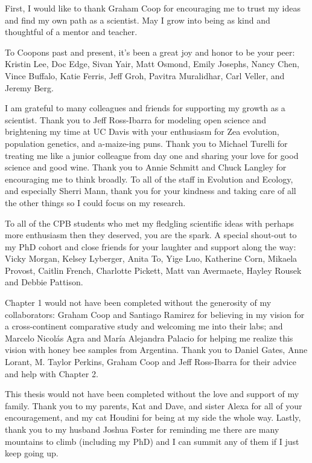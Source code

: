 First, I would like to thank Graham Coop for encouraging me to trust my ideas and find my own path as a scientist. May I grow into being as kind and thoughtful of a mentor and teacher. 

To Coopons past and present, it’s been a great joy and honor to be your peer: Kristin Lee, Doc Edge, Sivan Yair, Matt Osmond, Emily Josephs, Nancy Chen, Vince Buffalo, Katie Ferris, Jeff Groh, Pavitra Muralidhar, Carl Veller, and Jeremy Berg.

I am grateful to many colleagues and friends for supporting my growth as a scientist. Thank you to Jeff Ross-Ibarra for modeling open science and brightening my time at UC Davis with your enthusiasm for Zea evolution, population genetics, and a-maize-ing puns. Thank you to Michael Turelli for treating me like a junior colleague from day one and sharing your love for good science and good wine. Thank you to Annie Schmitt and Chuck Langley for encouraging me to think broadly. To all of the staff in Evolution and Ecology, and especially Sherri Mann, thank you for your kindness and taking care of all the other things so I could focus on my research. 

To all of the CPB students who met my fledgling scientific ideas with perhaps more enthusiasm then they deserved, you are the spark. A special shout-out to my PhD cohort and close friends for your laughter and support along the way: Vicky Morgan, Kelsey Lyberger, Anita To, Yige Luo, Katherine Corn, Mikaela Provost, Caitlin French, Charlotte Pickett, Matt van Avermaete, Hayley Rousek and Debbie Pattison.

Chapter 1 would not have been completed without the generosity of my collaborators: Graham Coop and Santiago Ramirez for believing in my vision for a cross-continent comparative study and welcoming me into their labs; and Marcelo Nicolás Agra and María Alejandra Palacio for helping me realize this vision with honey bee samples from Argentina. Thank you to Daniel Gates, Anne Lorant, M. Taylor Perkins, Graham Coop and Jeff Ross-Ibarra for their advice and help with Chapter 2.

This thesis would not have been completed without the love and support of my family. Thank you to my parents, Kat and Dave, and sister Alexa for all of your encouragement, and my cat Houdini for being at my side the whole way. Lastly, thank you to my husband Joshua Foster for reminding me there are many mountains to climb (including my PhD) and I can summit any of them if I just keep going up.